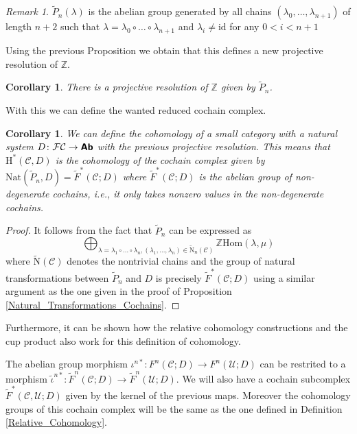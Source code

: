 \documentclass[12pt,reqno]{amsart}
\newtheorem{corollary}[teo]{Corollary}
\theoremstyle{definition}
\theoremstyle{remark}
\newtheorem{rem}[teo]{Remark}
\numberwithin{figure}{section}%
\newcommand{\CC}{\mathcal{C}}
\newcommand{\Ho}{\mathrm{H}}
\newcommand{\F}{\mathcal{F}}
\newcommand{\id}{\mathrm{id}}
\newcommand{\N}{\mathrm{N}}
\newcommand{\Ab}{\textbf{\textsf{Ab}}}
\newcommand{\Uc}{\mathcal{U}}
\begin{document}
\begin{rem}
     $\tilde{P}_n(\lambda)$ is the abelian group generated by all chains  $(\lambda_0,\dots,\lambda_{n+1})$  of length $n+2$ such that $\lambda=\lambda_0 \circ \dots \circ \lambda_{n+1}$ and $\lambda_i\neq\id$ for any $0 < i <n+1$
\end{rem}
Using the previous Proposition we obtain that this defines a new projective resolution of $\mathbb{Z}$.
\begin{corollary}
    There is a projective resolution of $\mathbb{Z}$ given by $\tilde{P}_n$.
\end{corollary}

With this we can define the wanted reduced cochain complex.
    
\begin{corollary}\label{Projective_Resolution2}
    We can define the cohomology of a small category with a natural system $D \colon \F \CC \rightarrow \Ab $ with the previous projective resolution. This means that $\Ho^*(\CC,D)$ is the cohomology of the cochain complex given by $\mathrm{Nat}(\tilde{P}_n,D)=\tilde{F}^*(\CC;D)$ where $\tilde{F}^*(\CC;D)$ is the abelian group of non-degenerate cochains, i.e., it only takes nonzero values in the non-degenerate cochains.
\end{corollary}

\begin{proof}
    It follows from the fact that $\tilde{P}_n$ can be expressed as $$\bigoplus_{\lambda=\lambda_1\circ \dots \circ \lambda_n,(\lambda_1, \dots, \lambda_n) \in\tilde{\N}_n(\CC) } \mathbb{Z} \mathrm{Hom}(\lambda,\mu)$$ where $\tilde{\N}(\CC)$ denotes the nontrivial chains and the group of natural transformations between $\tilde{P}_n$ and $D$ is precisely $\tilde{F}^*(\CC;D)$ using a similar argument as the one given in the proof of Proposition \ref{Natural_Transformations_Cochains}.
\end{proof}

Furthermore, it can be shown how the relative cohomology constructions and the cup product also work for this definition of cohomology.

The abelian group morphism $\iota^{n*} \colon F^n(\CC;D) \rightarrow F^n(\Uc;D)$ can be restrited to a morphism $\tilde\iota^{n*} \colon \tilde F^n(\CC;D) \rightarrow \tilde F^n(\Uc;D)$. We will also have a cochain subcomplex $\tilde F^*(\CC,\Uc;D)$ given by the kernel of the previous maps. Moreover the cohomology groups of this cochain complex will be the same as the one defined in Definition \ref{Relative_Cohomology}.
\end{document}
